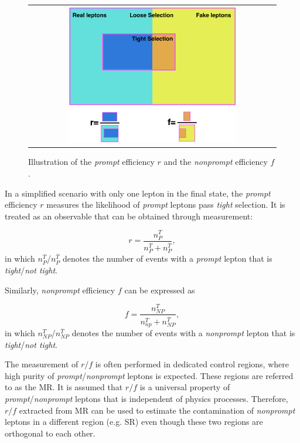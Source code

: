  \begin{figure}[tbh!]
 \begin{center}
 \begin{tabular}{c}
 \includegraphics[width=0.7\textwidth]{figures/Part3/Nonprompt/matrix}
 \end{tabular}
 \caption{Illustration of the \emph{prompt} efficiency $r$ and the \emph{nonprompt} efficiency $f$.}
 \label{fig:Matrix_Method}
 \end{center}
\end{figure}

In a simplified scenario with only one lepton in the final state, the \emph{prompt} efficiency $r$ measures the likelihood of \emph{prompt} leptons pass \emph{tight} selection. It is treated as an observable that can be obtained through measurement:

\begin{equation}
r=\frac{n_P^{T}}{n_P^{T}+n_P^{\overline{T}}},
 \label{eq:real_rate}
\end{equation}
in which $n_P^{T}$/$n_P^{\overline{T}}$ denotes the number of events with a \emph{prompt} lepton that is \emph{tight}/\emph{not tight}.

Similarly, \emph{nonprompt} efficiency $f$ can be expressed as

\begin{equation}
f=\frac{n_{NP}^{T}}{n_{np}^{T}+n_{NP}^{\overline{T}}},
 \label{eq:fake_rate}
\end{equation}
in which $n_{NP}^{T}$/$n_{NP}^{\overline{T}}$ denotes the number of events with a \emph{nonprompt} lepton that is \emph{tight}/\emph{not tight}.

The measurement of $r/f$ is often performed in dedicated control regions, where high purity of \emph{prompt}/\emph{nonprompt} leptons is expected. These regions are referred to as the \ac{MR}. It is assumed that $r/f$ is a universal property of \emph{prompt}/\emph{nonprompt} leptons that is independent of physics processes. Therefore, $r/f$ extracted from \ac{MR} can be used to estimate the contamination of \emph{nonprompt} leptons in a different region (e.g. \ac{SR}) even though these two regions are orthogonal to each other.

